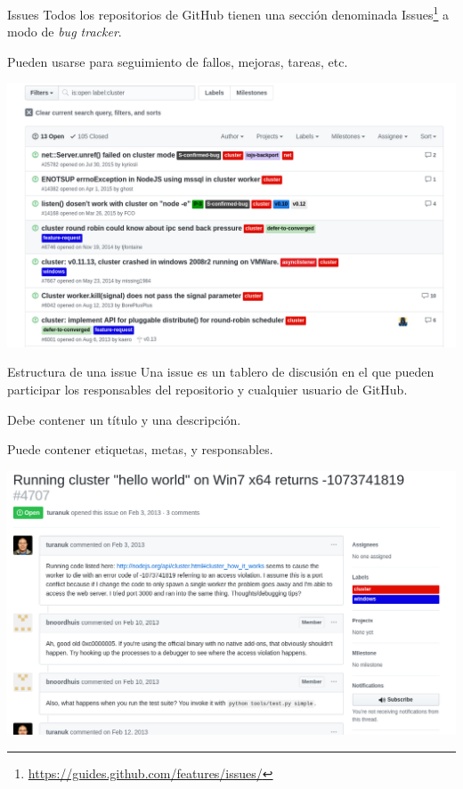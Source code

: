 \documentclass[xcolor={usenames,svgnames,dvipsnames}]{beamer}
\begin{document}
\begin{frame}[label={sec:org357a2c8}]{Issues}
Todos los repositorios de GitHub tienen una sección denominada \guillemotleft{}Issues\guillemotright{}\footnote{\url{https://guides.github.com/features/issues/}} a modo de \emph{bug tracker}.

Pueden usarse para seguimiento de fallos, mejoras, tareas, etc.

\begin{center}
\includegraphics[width=.9\linewidth]{figs/github_issues.png}
\end{center}
\end{frame}

\begin{frame}[label={sec:org442d078}]{Estructura de una issue}
Una issue es un tablero de discusión en el que pueden participar los responsables del repositorio y cualquier usuario de GitHub.

\alert{Debe} contener un título y una descripción.

\alert{Puede} contener etiquetas, metas, y responsables.

\begin{center}
\includegraphics[width=.9\linewidth]{figs/github_issue_example.png}
\end{center}
\end{frame}
\end{document}
